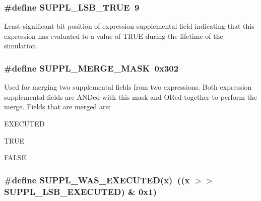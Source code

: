 \subsubsection{\setlength{\rightskip}{0pt plus 5cm}\#define SUPPL\_\-LSB\_\-TRUE\ 9}\label{group__expr__suppl_a5}


Least-significant bit position of expression supplemental field indicating that this expression has evaluated to a value of TRUE during the lifetime of the simulation. 
\subsubsection{\setlength{\rightskip}{0pt plus 5cm}\#define SUPPL\_\-MERGE\_\-MASK\ 0x302}\label{group__expr__suppl_a7}


Used for merging two supplemental fields from two expressions. Both expression supplemental fields are ANDed with this mask and ORed together to perform the merge. Fields that are merged are:\begin{CompactItemize}
\item 
EXECUTED\item 
TRUE\item 
FALSE \end{CompactItemize}
\subsubsection{\setlength{\rightskip}{0pt plus 5cm}\#define SUPPL\_\-WAS\_\-EXECUTED(x)\ ((x $>$$>$ SUPPL\_\-LSB\_\-EXECUTED) \& 0x1)}\label{group__expr__suppl_a8}


